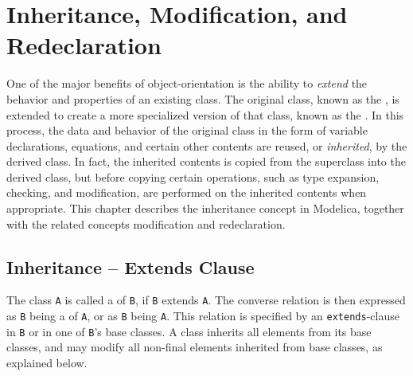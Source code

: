 \chapter{Inheritance, Modification, and Redeclaration}\label{inheritance-modification-and-redeclaration}

One of the major benefits of object-orientation is the ability to \emph{extend} the behavior and properties of an existing class.
The original class, known as the , is extended to create a more specialized version of that class, known as the .
In this process, the data and behavior of the original class in the form of variable declarations, equations, and certain other contents are reused, or \emph{inherited}, by the derived class.
In fact, the inherited contents is copied from the superclass into the derived class, but before copying certain operations, such as type expansion, checking, and modification, are performed on the inherited contents when appropriate.
This chapter describes the inheritance concept in Modelica, together with the related concepts modification and redeclaration.

\section{Inheritance -- Extends Clause}\label{inheritance-extends-clause}

The class \lstinline!A! is called a  of \lstinline!B!, if \lstinline!B! extends \lstinline!A!.
The converse relation is then expressed as \lstinline!B! being a  of \lstinline!A!, or as \lstinline!B! being  \lstinline!A!.
This relation is specified by an \lstinline!extends!-clause in \lstinline!B! or in one of \lstinline!B!'s base classes.
A class inherits all elements from its base classes, and may modify all non-final elements inherited from base classes, as explained below.

